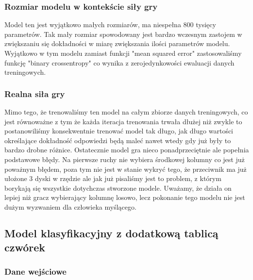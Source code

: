 \documentclass[12pt]{article}
\begin{document}
\subsubsection{Rozmiar modelu w kontekście siły gry}

Model ten jest wyjątkowo małych rozmiarów, ma niespełna 800 tysięcy parametrów. Tak mały rozmiar spowodowany jest bardzo wczesnym zastojem w zwiększaniu się dokładności w miarę zwiększania ilości parametrów modelu. Wyjątkowo w tym modelu zamiast funkcji "mean squared error" zastosowaliśmy funkcję "binary crossentropy" co wynika z zerojedynkowości ewaluacji danych treningowych.

\subsubsection{Realna siła gry}

Mimo tego, że trenowaliśmy ten model na całym zbiorze danych treningowych, co jest równoważne z tym że każda iteracja trenowania trwała dłużej niż zwykle to postanowiliśmy konsekwentnie trenować model tak długo, jak długo wartości określające dokładność odpowiedzi będą maleć nawet wtedy gdy już były to bardzo drobne różnice. Ostatecznie model gra nieco ponadprzeciętnie ale popełnia podstawowe błędy. Na pierwsze ruchy nie wybiera środkowej kolumny co jest już poważnym błędem, poza tym nie jest w stanie wykryć tego, że przeciwnik ma już ułożone 3 dyski w rzędzie ale jak już pisaliśmy jest to problem, z którym borykają się wszystkie dotychczas stworzone modele. Uważamy, że działa on lepiej niż gracz wybierający kolumnę losowo, lecz pokonanie tego modelu nie jest dużym wyzwaniem dla człowieka myślącego.

\subsection{Model klasyfikacyjny z dodatkową tablicą czwórek}

\subsubsection{Dane wejściowe}
\end{document}
